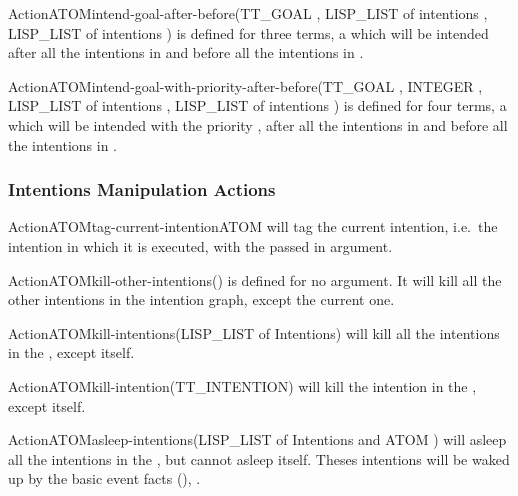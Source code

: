 \begin{typeefa}{Action}{ATOM}{intend-goal-after-before}{(TT\_GOAL
,
LISP\_LIST of intentions , LISP\_LIST of intentions )} is
defined for three terms, a   which will be intended
after all the intentions in  and before all the intentions in
.
\end{typeefa}

\begin{typeefa}{Action}{ATOM}{intend-goal-with-priority-after-before}{(TT\_GOAL , INTEGER , LISP\_LIST of intentions ,
LISP\_LIST of intentions )}
is defined for four terms, a   which will be
intended  with the priority , after all the intentions in
 and before all the intentions in .
\end{typeefa}

\subsubsection{Intentions Manipulation Actions}

\begin{typeefa}{Action}{ATOM}{tag-current-intention}{ATOM }
will tag the current intention, i.e.\ the intention in which it is executed, with
the  passed in argument.
\end{typeefa}

\begin{typeefa}{Action}{ATOM}{kill-other-intentions}{()}
is defined for no argument. It will kill all the other intentions in the
intention graph, except the current one.
\end{typeefa}

\begin{typeefa}{Action}{ATOM}{kill-intentions}{(LISP\_LIST of Intentions)}
will kill all the intentions in the , except itself.
\end{typeefa}

\begin{typeefa}{Action}{ATOM}{kill-intention}{(TT\_INTENTION)}
will kill the intention in the , except itself.
\end{typeefa}

\begin{typeefa}{Action}{ATOM}{asleep-intentions}{(LISP\_LIST of Intentions and ATOM )}
will asleep all the intentions in the , but cannot asleep itself.
Theses intentions will be waked up by the basic event facts (),  .
\end{typeefa}

